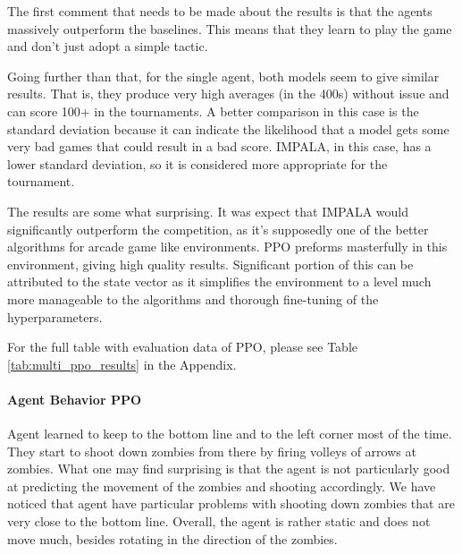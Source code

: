 \documentclass[12pt,a4paper, onecolumn]{exam}
\begin{document}
The first comment that needs to be made about the results is that the agents massively outperform the baselines. This means that they learn to play
the game and don't just adopt a simple tactic.

Going further than that, for the single agent, both models seem to give similar results. That is, they produce very high averages (in the 400s) without issue and
can score 100+ in the tournaments. %
A better comparison in this case is the standard deviation because it can indicate the likelihood that a model gets some very bad games that could
result in a bad score. IMPALA, in this case, has a lower standard deviation, so it is considered more appropriate for the tournament.

The results are some what surprising. It was expect that IMPALA would significantly outperform the competition, as it's supposedly one of the better algorithms
for arcade game like environments. PPO preforms masterfully in this environment, giving high quality results. Significant portion of this can be attributed
to the state vector as it simplifies the environment to a level much more manageable to the algorithms and thorough fine-tuning of the hyperparameters.

For the full table with evaluation data of PPO, please see Table \ref{tab:multi_ppo_results} in the Appendix.

\paragraph{Agent Behavior PPO}
Agent learned to keep to the bottom line and to the left corner most of the time. They start to shoot down zombies from there by firing volleys of arrows at zombies.
What one may find surprising is that the agent is not particularly good at predicting the movement of the zombies and shooting accordingly.
We have noticed that agent have particular problems with shooting down zombies that are very close to the bottom line.
Overall, the agent is rather static and does not move much, besides rotating in the direction of the zombies.
\end{document}
